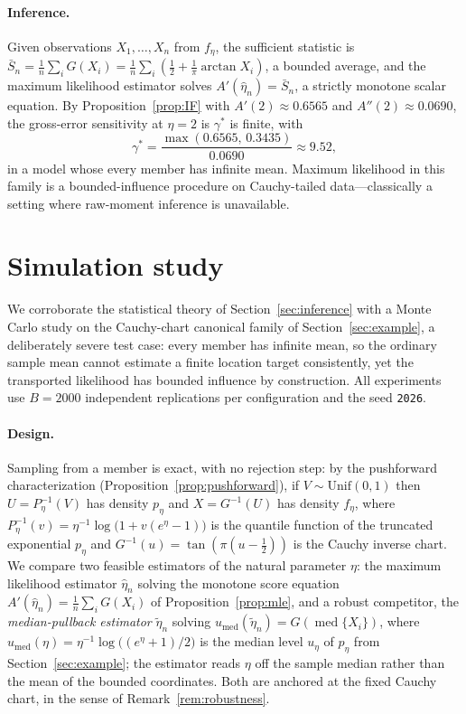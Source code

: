 \documentclass[11pt]{article}
\theoremstyle{definition}
\newcommand{\Unif}{\mathrm{Unif}}
\begin{document}
\paragraph{Inference.}
Given observations $X_1,\dots,X_n$ from $f_\eta$, the sufficient statistic
is $\bar S_n=\frac1n\sum_iG(X_i)=\frac1n\sum_i(\frac12+\frac1\pi\arctan
X_i)$, a bounded average, and the maximum likelihood estimator solves
$A'(\hat\eta_n)=\bar S_n$, a strictly monotone scalar equation. By
Proposition~\ref{prop:IF} with $A'(2)\approx0.6565$ and
$A''(2)\approx0.0690$, the gross-error sensitivity at $\eta=2$ is
$\gamma^*$ is finite, with
\[
\gamma^*=\frac{\max(0.6565,\,0.3435)}{0.0690}\approx9.52,
\]
in a model
whose every member has infinite mean. Maximum likelihood in this family is
a bounded-influence procedure on Cauchy-tailed data---classically a
setting where raw-moment inference is unavailable.

\section{Simulation study}\label{sec:simulation}

We corroborate the statistical theory of Section~\ref{sec:inference} with a
Monte Carlo study on the Cauchy-chart canonical family of
Section~\ref{sec:example}, a deliberately severe test case: every member
has infinite mean, so the ordinary sample mean cannot estimate a finite
location target consistently, yet the transported likelihood has bounded
influence by construction. All experiments use $B=2000$ independent
replications per configuration and the seed \texttt{2026}.

\paragraph{Design.}
Sampling from a member is exact, with no rejection step: by the pushforward
characterization (Proposition~\ref{prop:pushforward}), if
$V\sim\Unif(0,1)$ then $U=P_\eta^{-1}(V)$ has density $p_\eta$ and
$X=G^{-1}(U)$ has density $f_\eta$, where
$P_\eta^{-1}(v)=\eta^{-1}\log\bigl(1+v(e^\eta-1)\bigr)$ is the quantile
function of the truncated exponential $p_\eta$ and
$G^{-1}(u)=\tan(\pi(u-\tfrac12))$ is the Cauchy inverse chart. We compare
two feasible estimators of the natural parameter $\eta$: the maximum
likelihood estimator $\hat\eta_n$ solving the monotone score equation
$A'(\hat\eta_n)=\tfrac1n\sum_iG(X_i)$ of Proposition~\ref{prop:mle}, and a
robust competitor, the \emph{median-pullback estimator} $\tilde\eta_n$
solving $u_{\mathrm{med}}(\tilde\eta_n)=G(\operatorname{med}\{X_i\})$, where
$u_{\mathrm{med}}(\eta)=\eta^{-1}\log\bigl((e^\eta+1)/2\bigr)$ is the median
level $u_\eta$ of $p_\eta$ from Section~\ref{sec:example}; the estimator
reads $\eta$ off the sample median rather than the mean of the bounded
coordinates. Both are anchored at the fixed Cauchy chart, in the sense of
Remark~\ref{rem:robustness}.
\end{document}
